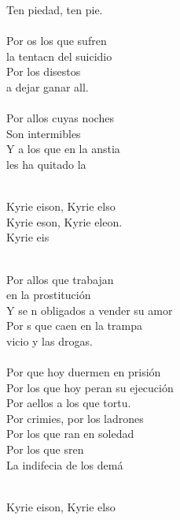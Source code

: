 \begin{cancion}[Noche][Hakuna]
	Ten piedad, ten pie.\\
\jump\\
	Por os los que sufren\\
	la tentacn del suicidio \\
	Por los disestos\\
	a dejar ganar all.\\
\jump\\
	Por allos cuyas noches\\
	Son intermibles\\
	Y a los que en la anstia\\
	les ha quitado la  \\\jump\\
	\begin{chorus}%
	Kyrie eison, Kyrie elso\\
	Kyrie eson, Kyrie eleon.\\
	Kyrie eis\\
	\end{chorus}%
	\jump\\
	Por allos que trabajan\\
en la prostitución\\
	Y se n obligados a vender su amor\\
	Por s que caen en la trampa\\
	 vicio y las drogas.\\
\jump\\
	Por  que hoy duermen en prisión\\
	Por los que hoy peran su ejecución\\
	Por aellos a los que tortu.\\
	Por crimies, por los ladrones\\
	Por los que ran en soledad\\
	Por los que sren\\
	La indifecia de los demá\\\jump\\
	\begin{chorus}%
	Kyrie eison, Kyrie elso\\

\end{chorus}
\end{cancion}
